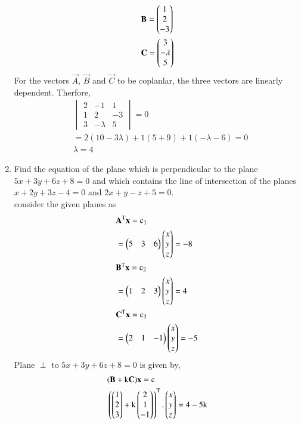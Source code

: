 \documentclass[journal,12pt,twocolumn]{IEEEtran}
\renewcommand\thesection{\arabic{section}}
\begin{document}
\begin{enumerate}[label=\thesection.\arabic*.,ref=\thesection.\theenumi]
\begin{align}
&\mathbf{B}=\begin{pmatrix}1\\2\\-3\end{pmatrix}\\
&\mathbf{C}=\begin{pmatrix}3\\-\lambda\\5\end{pmatrix}
\end{align}
For the vectors $\vec{A}$, $\vec{B}$ and $\vec{C}$ to be coplanlar, the three vectors are linearly dependent. Therfore,
\begin{align}
  &\begin{vmatrix}
    2 & -1& 1\\ 1& 2& -3\\3&-\lambda&5 
    \end{vmatrix} = 0 \\
& = 2(10-3\lambda)+1(5+9)+1(-\lambda -6)=0\\
& \lambda=4
\end{align}
\item Find the equation of the plane which is perpendicular to the plane $5x + 3y + 6 z + 8 = 0$ and which contains the line of intersection of the planes $x + 2y + 3z - 4 = 0 $ and $2x + y - z + 5 = 0$.\\ 
\solution consider the given planes as
\begin{align}
&\mathbf{A}^\text T\mathbf{x}=\text c_1\nonumber \\&=\begin{pmatrix}5&3&6\end{pmatrix}\begin{pmatrix}x\\y\\z\end{pmatrix}=-8 \label{eq:0.0.46}\\ 
&\mathbf{B}^\text T\mathbf{x}=\text c_2\nonumber \\&=\begin{pmatrix}1&2&3\end{pmatrix}\begin{pmatrix}x\\y\\z\end{pmatrix}=4\\
  &\mathbf{C}^\text T\mathbf{x}=\text c_3\nonumber \\&=\begin{pmatrix}2&1&-1\end{pmatrix}\begin{pmatrix}x\\y\\z\end{pmatrix}=-5
\end{align}
Plane $\perp$ to $5x + 3y + 6 z + 8 = 0$ is given by,
\begin{align}
&(\mathbf{B}+\text k\mathbf{C})\mathbf{x}= \text c\\
&\left(\begin{pmatrix}1\\2\\3\end{pmatrix}+\text k\begin{pmatrix}2\\1\\-1\end{pmatrix}\right)^\text T.\begin{pmatrix}x\\y\\z\end{pmatrix} =4-5\text k \label{eq:0.0.50} 
\end{align}

\end{enumerate}
\end{document}
